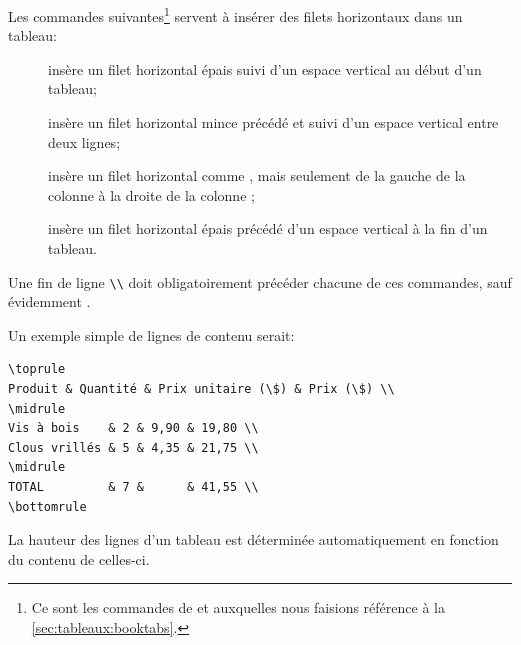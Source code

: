 \begin{list}{}
  Les commandes suivantes\footnote{%
    Ce sont les commandes de  et 
auxquelles nous faisions référence à la \autoref{sec:tableaux:booktabs}.} %
  servent à insérer des filets horizontaux dans un tableau:
  \begin{description}
  \item[\normalfont\cmd{\toprule}] insère un filet horizontal épais
    suivi d'un espace vertical au début d'un tableau;
  \item[\normalfont\cmd{\midrule}] insère un filet horizontal mince
    précédé et suivi d'un espace vertical entre deux lignes;
  \item[\normalfont{}] insère un filet
    horizontal comme \cmd{\midrule}, mais seulement de la gauche de la
    colonne  à la droite de la colonne ;
  \item[\normalfont\cmd{\bottomrule}] insère un filet horizontal épais
    précédé d'un espace vertical à la fin d'un tableau.
  \end{description}
  Une fin de ligne \verb=\\=  doit  obligatoirement précéder chacune
  de ces commandes, sauf évidemment \cmd{\toprule}.

  Un exemple simple de lignes de contenu serait:
\begin{lstlisting}
\toprule
Produit & Quantité & Prix unitaire (\$) & Prix (\$) \\
\midrule
Vis à bois    & 2 & 9,90 & 19,80 \\
Clous vrillés & 5 & 4,35 & 21,75 \\
\midrule
TOTAL         & 7 &      & 41,55 \\
\bottomrule
\end{lstlisting}
\end{list}

La hauteur des lignes d'un tableau est déterminée automatiquement en
fonction du contenu de celles-ci.

